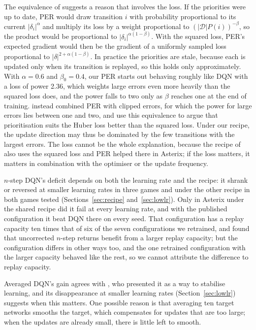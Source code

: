 \documentclass[conference,a4paper]{IEEEtran}
\begin{document}
The equivalence of \citet{fujimoto2020equivalence} suggests a reason that involves the loss. If the priorities were up
to date, PER would draw transition $i$ with probability proportional to its current $|\delta_i|^{\alpha}$ and multiply its loss by a weight proportional to
$(|\mathcal{D}|P(i))^{-\beta}$, so the product would be proportional to $|\delta_i|^{\alpha(1-\beta)}$. With the squared loss,
PER's expected gradient would then be the gradient of a uniformly sampled loss proportional to
$|\delta|^{2+\alpha(1-\beta)}$. In practice the priorities are stale, because each is updated only when its
transition is replayed, so this holds only approximately. With $\alpha=0.6$ and $\beta_0=0.4$, our PER starts out behaving roughly like DQN with a loss of
power 2.36, which weights large errors even more heavily than the squared loss does, and the power falls to two only
as $\beta$ reaches one at the end of training. \citet{schaul2016prioritized} instead combined PER with clipped errors,
for which the power for large errors lies between one and two, and \citet{fujimoto2020equivalence} use this
equivalence to argue that prioritisation suits the Huber loss better than the squared loss. Under our recipe, the
update direction may thus be dominated by the few transitions with the largest errors. The loss cannot be the whole
explanation, because the recipe of \citet{obandoceron2021revisiting} also uses the squared loss and PER helped there
in Asterix; if the loss matters, it matters in combination with the optimiser or the update frequency.

$n$-step DQN's deficit depends on both the learning rate and the recipe: it shrank or reversed at smaller learning
rates in three games and under the other recipe in both games tested (Sections~\ref{sec:recipe}
and~\ref{sec:lowlr}). Only in Asterix under the shared recipe did it fail at every learning rate, and with the
published configuration it beat DQN there on every seed. That configuration has a replay capacity ten times
that of six of the seven configurations we retrained, and \citet{fedus2020revisiting} found that uncorrected $n$-step
returns benefit from a larger replay capacity; but the configuration differs in other ways too, and the one retrained
configuration with the larger capacity behaved like the rest, so we cannot attribute the difference to replay capacity.

Averaged DQN's gain agrees with \citet{anschel2017averaged}, who presented it as a way to stabilise learning, and its
disappearance at smaller learning rates (Section~\ref{sec:lowlr}) suggests when this matters. One possible reason is
that averaging ten target networks smooths the target, which compensates for updates that are too large; when the
updates are already small, there is little left to smooth.
\end{document}
